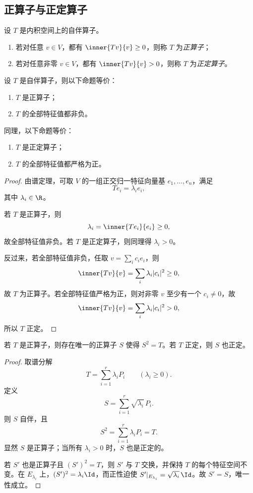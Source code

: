 \subsection{正算子与正定算子}

\begin{definition}
设 $T$ 是内积空间上的自伴算子。
\begin{enumerate}[label=\textnormal{(\arabic*)}]
  \item 若对任意 $v\in V$，都有 $\inner{Tv}{v}\ge 0$，则称 $T$ 为\emph{正算子}；
  \item 若对任意非零 $v\in V$，都有 $\inner{Tv}{v}>0$，则称 $T$ 为\emph{正定算子}。
\end{enumerate}
\end{definition}

\begin{proposition}
设 $T$ 是自伴算子，则以下命题等价：
\begin{enumerate}[label=\textnormal{(\arabic*)}]
  \item $T$ 是正算子；
  \item $T$ 的全部特征值都非负。
\end{enumerate}
同理，以下命题等价：
\begin{enumerate}[label=\textnormal{(\arabic*)},start=3]
  \item $T$ 是正定算子；
  \item $T$ 的全部特征值都严格为正。
\end{enumerate}
\end{proposition}

\begin{proof}
由谱定理，可取 $V$ 的一组正交归一特征向量基 $e_1,\dots,e_n$，满足
\[
Te_i=\lambda_i e_i,
\]
其中 $\lambda_i\in\R$。

若 $T$ 是正算子，则
\[
\lambda_i=\inner{Te_i}{e_i}\ge 0,
\]
故全部特征值非负。若 $T$ 是正定算子，则同理得 $\lambda_i>0$。

反过来，若全部特征值非负，任取 $v=\sum_i c_ie_i$，则
\[
\inner{Tv}{v}=\sum_i \lambda_i|c_i|^2\ge 0,
\]
故 $T$ 为正算子。若全部特征值严格为正，则对非零 $v$ 至少有一个 $c_i\ne0$，故
\[
\inner{Tv}{v}=\sum_i \lambda_i|c_i|^2>0,
\]
所以 $T$ 正定。
\end{proof}

\begin{corollary}[正平方根]
若 $T$ 是正算子，则存在唯一的正算子 $S$ 使得 $S^2=T$。若 $T$ 正定，则 $S$ 也正定。
\end{corollary}

\begin{proof}
取谱分解
\[
T=\sum_{i=1}^r \lambda_iP_i\qquad (\lambda_i\ge 0).
\]
定义
\[
S=\sum_{i=1}^r \sqrt{\lambda_i}\,P_i.
\]
则 $S$ 自伴，且
\[
S^2=\sum_{i=1}^r \lambda_iP_i=T.
\]
显然 $S$ 是正算子；当所有 $\lambda_i>0$ 时，$S$ 也是正定的。

若 $S'$ 也是正算子且 $(S')^2=T$，则 $S'$ 与 $T$ 交换，并保持 $T$ 的每个特征空间不变。在 $E_{\lambda_i}$ 上，$(S')^2=\lambda_i\Id$，而正性迫使 $S'|_{E_{\lambda_i}}=\sqrt{\lambda_i}\,\Id$。故 $S'=S$，唯一性成立。
\end{proof}

